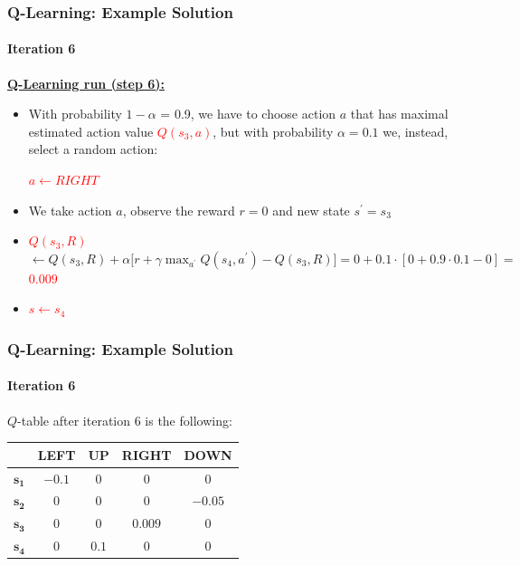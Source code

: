 \begin{frame}[<+->]
	\frametitle{Q-Learning: Example Solution}
	\framesubtitle{Iteration 6}
	
	\vspace{0.5cm}
	
	\textbf{\underline{Q-Learning run (step 6):}}
	
	\begin{itemize}
		\item With probability $ 1 - \alpha $ = 0.9, we have to choose action $ a $ that
			  has maximal estimated action value \textcolor{red}{$ Q(s_3,a) $}, but with
			  probability $ \alpha = 0.1 $ we, instead, select a random action:
			  
			  \begin{center}
				  \textcolor{red}{$ a \leftarrow RIGHT $}
			  \end{center}
		\item We take action $ a $, observe the reward $ r = 0 $ and new state $
			  s^\prime = s_3 $
		\item \textcolor{red}{$ Q(s_3,R) $} $ \leftarrow Q(s_3,R) + \alpha \Big [ r + \gamma \max_{a^\prime} Q(s_4,a^\prime) - Q(s_3,R) \Big ] = 0 + 0.1 \cdot [ 0 + 0.9 \cdot 0.1 - 0 ] = $ \textcolor{red}{$ 0.009 $}
		\item \textcolor{red}{$ s \leftarrow s_4 $}
	\end{itemize}
\end{frame}

\begin{frame}
	\frametitle{Q-Learning: Example Solution}
	\framesubtitle{Iteration 6}
	
	\Large
	
	$ Q $-table after iteration 6 is the following:
	
	\begin{table}[!h]
		\begin{tabular}{c|c|c|c|c|}
			\cline{2-5}
			& \textbf{LEFT} & \textbf{UP} & \textbf{RIGHT} & \textbf{DOWN} \\ \hline
			\multicolumn{1}{|c|}{$ \mathbf{s_1} $} & $ -0.1 $ & $ 0 $ & $ 0 $ & $ 0 $\\ \hline
			\multicolumn{1}{|c|}{$ \mathbf{s_2} $} & $ 0 $ & $ 0 $ & $ 0 $ & $ -0.05 $\\ \hline
			\multicolumn{1}{|c|}{$ \mathbf{s_3} $} & $ 0 $ & $ 0 $ & $ 0.009 $ & $ 0 $\\ \hline
			\multicolumn{1}{|c|}{$ \mathbf{s_4} $} & $ 0 $ & $ 0.1 $ & $ 0 $ & $ 0 $\\ \hline
		\end{tabular}
	\end{table}
\end{frame}

